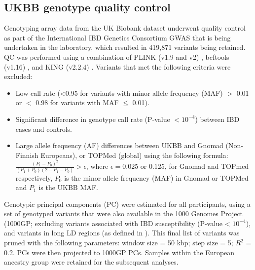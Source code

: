 \subsection{UKBB genotype quality control}
Genotyping array data from the UK Biobank dataset underwent quality control as part of the International IBD Genetics Consortium GWAS that is being undertaken in the laboratory, which resulted in 419,871 variants being retained. QC was performed using a combination of PLINK (v1.9 and v2) \cite{Purcell2007-mu}, bcftools (v1.16) \cite{Li2011-td}, and KING (v2.2.4) \cite{king-software}.  Variants that met the following criteria were excluded: 
\begin{itemize}
  \item Low call rate (<0.95 for variants with minor allele frequency (MAF) $>$ 0.01 or $<$ 0.98 for variants with MAF $\leq$ 0.01).
  \item Significant difference in genotype call rate (P-value $< 10^{-4}$) between IBD cases and controls.
  \item Large allele frequency (AF) differences between UKBB and Gnomad (Non-Finnish Europeans), or TOPMed (global) using the following formula: $\frac{(P_{1}-P_{0})^{2}}{(P_{1}+P_{0})(2-P_{1}-P_{0})} > \epsilon$, where $\epsilon=0.025$ or $0.125$, for Gnomad and TOPmed respectively,  $P_{0}$ is the minor allele frequency (MAF) in Gnomad or TOPMed and $P_{1}$ is the UKBB MAF. 
\end{itemize}

Genotypic principal components (PC) were estimated for all participants, using a set of genotyped variants that were also available in the 1000 Genomes Project (1000GP; excluding variants associated with IBD susceptibility (P-value < $10^{-4}$), and variants in long LD regions (as defined in \cite{plink_high_ld}). This final list of variants was pruned with the following parameters: window size = 50 kbp; step size = 5; $R^{2}$ = 0.2. PCs were then projected to 1000GP PCs. Samples within the European ancestry group were retained for the subsequent analyses. 



